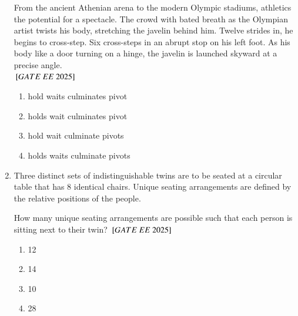 \documentclass[journal,12pt,onecolumn]{IEEEtran}
\theoremstyle{remark}
\begin{document}
\begin{enumerate}
\bigskip

From the ancient Athenian arena to the modern Olympic stadiums, athletics \underline{} the potential for a spectacle. The crowd \underline{} with bated breath as the Olympian artist twists his body, stretching the javelin behind him. Twelve strides in, he begins to cross-step. Six cross-steps \underline{} in an abrupt stop on his left foot. As his body \underline{} like a door turning on a hinge, the javelin is launched skyward at a precise angle. \\   
${}\left[GATE\ EE\ 2025\right]$\\
    \begin{enumerate}[label=(\Alph*)]
  \item {} hold \quad {} waits \quad {} culminates \quad {} pivot\\   \item {} holds \quad {} wait \quad {} culminates \quad {} pivot\\ 
 \item {} hold \quad {} wait \quad {} culminate \quad {} pivots\\  
  \item {} holds \quad {} waits \quad {} culminate \quad {} pivots\\     \end{enumerate}
  \item Three distinct sets of indistinguishable twins are to be seated at a circular table that has 8 identical chairs. Unique seating arrangements are defined by the relative positions of the people.

\medskip

How many unique seating arrangements are possible such that each person is sitting next to their twin?
${}\left[GATE\ EE\ 2025\right]$\\
   \begin{enumerate}[label=(\Alph*)]

  \item 12\\     
  \item 14\\  
  \item 10\\  
  \item 28\\  
    \end{enumerate}


\end{enumerate}
\end{document}
